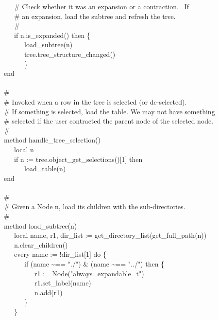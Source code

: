 {\>   \ \ \ \# Check whether it was an expansion or a contraction. \ If \\
\>   \ \ \ \# an expansion, load the subtree and refresh the tree. \\
\>   \ \ \ \# \\
\>   \ \ \ if n.is\_expanded() then \{ \\
\>   \ \ \ \ \ \ load\_subtree(n) \\
\>   \ \ \ \ \ \ tree.tree\_structure\_changed() \\
\>   \ \ \ \ \ \ \} \\
\>   end \\
\ \\
\>   \# \\
\>   \# Invoked when a row in the tree is selected (or de-selected). \\
\>   \# If something is selected, load the table. We may not have something\\
\>   \# selected if the user contracted the parent node of the selected node. \\
\>   \# \\
\>   method handle\_tree\_selection() \\
\>   \ \ \ local n \\
\>   \ \ \ if n := tree.object\_get\_selections()[1] then \\
\>   \ \ \ \ \ \ load\_table(n) \\
\>   end \\
\ \\
\>   \# \\
\>   \# Given a Node n, load its children with the sub-directories. \\
\>   \# \\
\>   method load\_subtree(n) \\
\>   \ \ \ local name, r1, dir\_list := get\_directory\_list(get\_full\_path(n)) \\
\>   \ \ \ n.clear\_children() \\
\>   \ \ \ every name := !dir\_list[1] do \{ \\
\>   \ \ \ \ \ \ if (name \~{}== "./") \&
(name \~{}== "../") then \{ \\
\>   \ \ \ \ \ \ \ \ \ r1 :=
Node("always\_expandable=t") \\
\>   \ \ \ \ \ \ \ \ \ r1.set\_label(name) \\
\>   \ \ \ \ \ \ \ \ \ n.add(r1) \\
\>   \ \ \ \ \ \ \} \\
\>   \ \ \ \} \\
}
